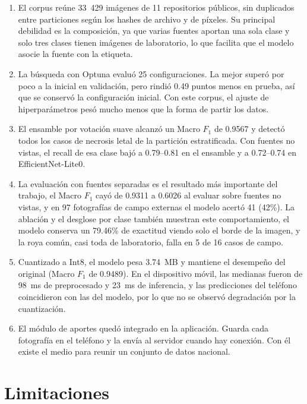 \begin{enumerate}
\item El corpus re\'une 33~429 im\'agenes de 11 repositorios p\'ublicos, sin duplicados entre particiones seg\'un los hashes de archivo y de p\'ixeles. Su principal debilidad es la composici\'on, ya que varias fuentes aportan una sola clase y solo tres clases tienen im\'agenes de laboratorio, lo que facilita que el modelo asocie la fuente con la etiqueta.
\item La b\'usqueda con Optuna evalu\'o 25 configuraciones. La mejor super\'o por poco a la inicial en validaci\'on, pero rindi\'o 0.49 puntos menos en prueba, as\'i que se conserv\'o la configuraci\'on inicial. Con este corpus, el ajuste de hiperpar\'ametros pes\'o mucho menos que la forma de partir los datos.
\item El ensamble por votaci\'on suave alcanz\'o un Macro $F_1$ de 0.9567 y detect\'o todos los casos de necrosis letal de la partici\'on estratificada. Con fuentes no vistas, el recall de esa clase baj\'o a 0.79--0.81 en el ensamble y a 0.72--0.74 en EfficientNet-Lite0.
\item La evaluaci\'on con fuentes separadas es el resultado m\'as importante del trabajo, el Macro $F_1$ cay\'o de 0.9311 a 0.6026 al evaluar sobre fuentes no vistas, y en 97 fotograf\'ias de campo externas el modelo acert\'o 41 (42\%). La ablaci\'on y el desglose por clase también muestran este comportamiento, el modelo conserva un 79.46\% de exactitud viendo solo el borde de la imagen, y la roya com\'un, casi toda de laboratorio, falla en 5 de 16 casos de campo.
\item Cuantizado a Int8, el modelo pesa 3.74~MB y mantiene el desempe\~no del original (Macro $F_1$ de 0.9489). En el dispositivo móvil, las medianas fueron de 98~ms de preprocesado y 23~ms de inferencia, y las predicciones del tel\'efono coincidieron con las del modelo, por lo que no se observ\'o degradaci\'on por la cuantizaci\'on.
\item El m\'odulo de aportes qued\'o integrado en la aplicaci\'on. Guarda cada fotograf\'ia en el tel\'efono y la env\'ia al servidor cuando hay conexi\'on. Con \'el existe el medio para reunir un conjunto de datos nacional.
\end{enumerate}

\section*{Limitaciones}


